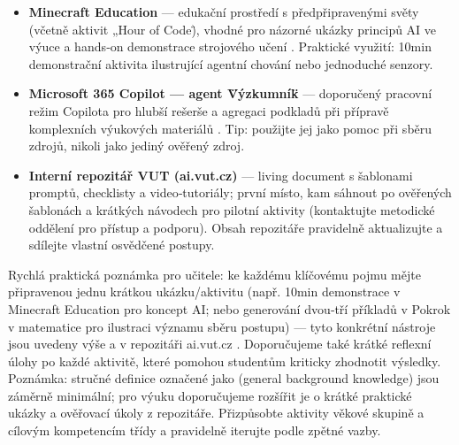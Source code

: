 \begin{itemize}
\item \textbf{Minecraft Education} --- edukační prostředí s předpřipravenými světy (včetně aktivit „Hour of Code\"), vhodné pro názorné ukázky principů AI ve výuce a hands‑on demonstrace strojového učení \cite{kb_ai_101_tipu_pdf_04e4a115_page_15_2}. Praktické využití: 10min demonstrační aktivita ilustrující agentní chování nebo jednoduché senzory.
\item \textbf{Microsoft 365 Copilot — agent \"Výzkumník\"} --- doporučený pracovní režim Copilota pro hlubší rešerše a agregaci podkladů při přípravě komplexních výukových materiálů \cite{kb_ai_101_tipu_pdf_04e4a115_page_48_1}. Tip: použijte jej jako pomoc při sběru zdrojů, nikoli jako jediný ověřený zdroj.
\item \textbf{Interní repozitář VUT (ai.vut.cz)} --- living document s šablonami promptů, checklisty a video‑tutoriály; první místo, kam sáhnout po ověřených šablonách a krátkých návodech pro pilotní aktivity (kontaktujte metodické oddělení pro přístup a podporu). Obsah repozitáře pravidelně aktualizujte a sdílejte vlastní osvědčené postupy.
\end{itemize}
Rychlá praktická poznámka pro učitele: ke každému klíčovému pojmu mějte připravenou jednu krátkou ukázku/aktivitu (např. 10min demonstrace v Minecraft Education pro koncept AI; nebo generování dvou‑tří příkladů v Pokrok v matematice pro ilustraci významu sběru postupu) — tyto konkrétní nástroje jsou uvedeny výše a v repozitáři ai.vut.cz \cite{kb_ai_101_tipu_pdf_04e4a115_page_15_2,kb_ai_101_tipu_pdf_04e4a115_page_8_1,kb_ai_101_tipu_pdf_04e4a115_page_48_1}. Doporučujeme také krátké reflexní úlohy po každé aktivitě, které pomohou studentům kriticky zhodnotit výsledky.
Poznámka: stručné definice označené jako (general background knowledge) jsou záměrně minimální; pro výuku doporučujeme rozšířit je o krátké praktické ukázky a ověřovací úkoly z repozitáře. Přizpůsobte aktivity věkové skupině a cílovým kompetencím třídy a pravidelně iterujte podle zpětné vazby.